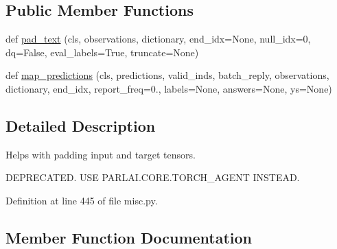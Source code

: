 \subsection*{Public Member Functions}
\begin{DoxyCompactItemize}
\item 
def \hyperlink{classparlai_1_1utils_1_1misc_1_1PaddingUtils_acd7178452139c55dc56e9889b10347cc}{pad\+\_\+text} (cls, observations, dictionary, end\+\_\+idx=None, null\+\_\+idx=0, dq=False, eval\+\_\+labels=True, truncate=None)
\item 
def \hyperlink{classparlai_1_1utils_1_1misc_1_1PaddingUtils_ae862960e8f261ff4088d5dedbe42a25c}{map\+\_\+predictions} (cls, predictions, valid\+\_\+inds, batch\+\_\+reply, observations, dictionary, end\+\_\+idx, report\+\_\+freq=0., labels=None, answers=None, ys=None)
\end{DoxyCompactItemize}


\subsection{Detailed Description}
\begin{DoxyVerb}Helps with padding input and target tensors.

DEPRECATED. USE PARLAI.CORE.TORCH_AGENT INSTEAD.
\end{DoxyVerb}
 

Definition at line 445 of file misc.\+py.



\subsection{Member Function Documentation}
\mbox{\label{classparlai_1_1utils_1_1misc_1_1PaddingUtils_ae862960e8f261ff4088d5dedbe42a25c}} 
